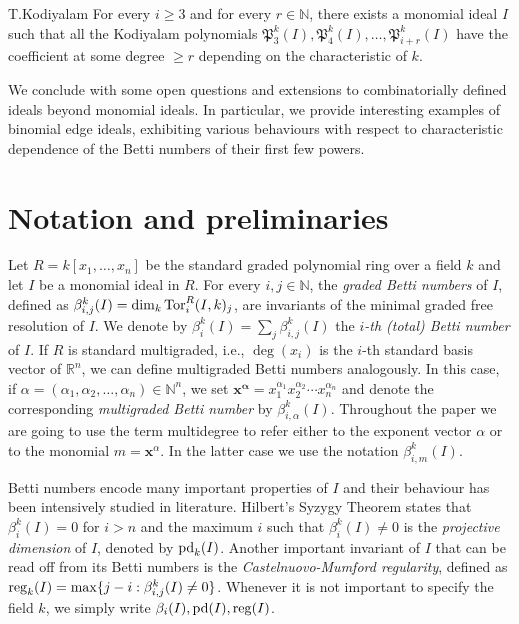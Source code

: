 \documentclass[11pt,oneside]{amsart}
\theoremstyle{plain}
\theoremstyle{definition}
\newcommand{\pd}{{\rm pd}}
\newcommand{\reg}{{\rm reg}}
\begin{document}
\begin{reptheorem}{T.Kodiyalam}
For every $i \geq 3$ and for every $r \in \mathbb{N}$, there exists a monomial ideal $I$ such that all the Kodiyalam polynomials $\mathfrak P^k_{3}(I),\mathfrak P^k_{4}(I),\dots,\mathfrak P^k_{i+r}(I)$ have the coefficient at some degree $\geq r$ depending on the characteristic of $k$.
\end{reptheorem}

We conclude with some open questions and extensions to combinatorially defined ideals beyond monomial ideals.
In particular, we provide interesting examples of binomial edge ideals, exhibiting various behaviours with respect to characteristic dependence of the Betti numbers of their first few powers.


\section{Notation and preliminaries}

Let $R=k[x_1, \dots, x_n]$ be the standard graded polynomial ring over a field $k$ and let $I$ be a monomial ideal in $R$. For every $i,j \in \mathbb{N}$, the {\em graded Betti numbers} of $I$, defined as $\beta^k_{i,j}(I)=\dim_k {\rm Tor}^R_i(I,k)_j$, are invariants of the minimal graded free resolution of $I$.
We denote by $\beta^k_i(I)=\sum_{j} \beta^k_{i,j}(I)$ the \textit{$i$-th (total) Betti number} of $I$. If $R$ is standard multigraded, i.e., $\deg(x_i)$ is the $i$-th standard basis vector of $\mathbb{R}^n$, we can define multigraded Betti numbers analogously. In this case, 
if $\alpha = (\alpha_1, \alpha_2, \dots, \alpha_n) \in \mathbb{N}^n$, we set $\mathbf{x}^\mathbf{\alpha} = x_1^{\alpha_1} x_2^{\alpha_2} \cdots x_n^{\alpha_n}$ and denote the corresponding \textit{multigraded Betti number} by $\beta^k_{i,\alpha}(I)$. Throughout the paper we are going to use the term multidegree to refer either to the exponent vector $\alpha$ or to the monomial $m = \mathbf{x}^\alpha$. In the latter case we use the notation $\beta_{i,m}^k(I)$.

Betti numbers encode many important properties of $I$ and their behaviour has been intensively studied in literature. Hilbert's Syzygy Theorem states that $\beta^k_{i}(I)=0$ for $i>n$ and the maximum $i$ such that $\beta^k_{i}(I) \neq 0$ is the {\it projective dimension} of $I$, denoted by $\pd_k(I)$. Another important invariant of $I$ that can be read off from its Betti numbers is the {\it Castelnuovo-Mumford regularity}, defined as $\reg_k(I)=\max\{j-i : \beta^k_{i,j}(I) \neq 0\}$. Whenever it is not important to specify the field $k$, we simply write $\beta_i(I), \pd(I), \reg(I)$.
\end{document}

